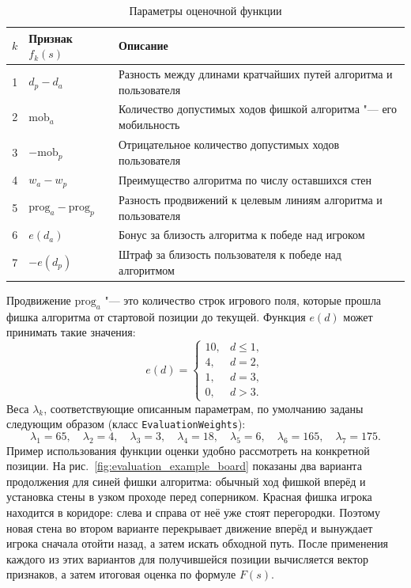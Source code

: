 \documentclass[a4paper,12pt]{diplom}
\renewcommand{\le}{\leqslant}
\begin{document}
\begin{table}[H]
    \centering
    \caption{Параметры оценочной функции}
    \label{tab:features}
    \begin{tabular}{clp{7cm}}
        \toprule
        $k$ & Признак $f_k(s)$ & Описание \\
        \midrule
        1 & $d_p - d_a$ & Разность между длинами кратчайших путей алгоритма и пользователя \\
        2 & $\mathrm{mob}_a$ & Количество допустимых ходов фишкой алгоритма "--- его мобильность \\
        3 & $-\mathrm{mob}_p$ & Отрицательное количество допустимых ходов пользователя \\
        4 & $w_a - w_p$ & Преимущество алгоритма по числу оставшихся стен \\
        5 & $\mathrm{prog}_a - \mathrm{prog}_p$ & Разность продвижений к целевым линиям алгоритма и пользователя \\
        6 & $e(d_a)$ & Бонус за близость алгоритма к победе над игроком \\
        7 & $-e(d_p)$ & Штраф за близость пользователя к победе над алгоритмом \\
        \bottomrule
    \end{tabular}
\end{table}

Продвижение $\mathrm{prog}_a$ "--- это количество строк игрового поля, которые прошла фишка алгоритма от стартовой позиции до текущей. Функция $e(d)$ может принимать такие значения:
\[
e(d) = \begin{cases}
    10, & d \le 1, \\
    4,  & d = 2, \\
    1,  & d = 3, \\
    0,  & d > 3.
\end{cases}
\]
Веса $\lambda_k$, соответствующие описанным параметрам, по умолчанию заданы следующим образом (класс \texttt{EvaluationWeights}):
\[
\lambda_1 = 65,\quad \lambda_2 = 4,\quad \lambda_3 = 3,\quad \lambda_4 = 18,\quad \lambda_5 = 6,\quad \lambda_6 = 165,\quad \lambda_7 = 175.
\]
Пример использования функции оценки удобно рассмотреть на конкретной позиции. На рис.~\ref{fig:evaluation_example_board} показаны два варианта продолжения для синей фишки алгоритма: обычный ход фишкой вперёд и установка стены в узком проходе перед соперником. Красная фишка игрока находится в коридоре: слева и справа от неё уже стоят перегородки. Поэтому новая стена во втором варианте перекрывает движение вперёд и вынуждает игрока сначала отойти назад, а затем искать обходной путь. После применения каждого из этих вариантов для получившейся позиции вычисляется вектор признаков, а затем итоговая оценка по формуле $F(s)$.
\end{document}

